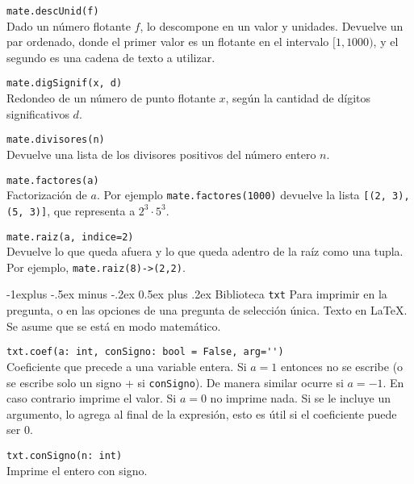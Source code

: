 \documentclass[10pt,landscape]{article}
\makeatletter
\renewcommand{\subsection}{\@startsection{subsection}{2}{0mm}%
                                {-1explus -.5ex minus -.2ex}%
                                {0.5ex plus .2ex}%
                                {\normalfont\normalsize\bfseries}}
\makeatother
\begin{document}
\begin{multicols}{3}
\begin{asparaitem}
\item \verb|mate.descUnid(f)| \\
  \quad Dado un n\'umero flotante $f$, lo descompone en un valor y unidades. Devuelve un par ordenado, donde el primer valor es un flotante en el intervalo $[1, 1000)$, y el segundo es una cadena de texto a utilizar.

\item \verb|mate.digSignif(x, d)| \\
  \quad Redondeo de un n\'umero de punto flotante $x$, seg\'un la cantidad de d\'igitos significativos $d$.

\item \verb|mate.divisores(n)| \\
  \quad Devuelve una lista de los divisores positivos del n\'umero entero $n$.

  \item \verb|mate.factores(a)| \\
\quad Factorización de $a$. Por ejemplo \verb|mate.factores(1000)| devuelve la lista \verb|[(2, 3), (5, 3)]|, que representa a $2^3\cdot 5^3$.

  \item \verb|mate.raiz(a, indice=2)| \\
    \quad Devuelve lo que queda afuera y lo que queda adentro de la ra\'iz como una tupla. Por ejemplo, \verb|mate.raiz(8)->(2,2)|.

\end{asparaitem}

\subsection{Biblioteca \texttt{txt}}
Para imprimir en la pregunta, o en las opciones de una pregunta de selecci\'on \'unica. Texto en \LaTeX. Se asume que se est\'a en modo matem\'atico.
\begin{asparaitem}
\item \verb|txt.coef(a: int, conSigno: bool = False, arg='')| \\
\quad Coeficiente que precede a una variable entera. Si $a=1$ entonces no se escribe (o se escribe solo un signo + si \verb|conSigno|). De manera similar ocurre si $a=-1$. En caso contrario imprime el valor. Si $a=0$ no imprime nada. Si se le incluye un argumento, lo agrega al final de la expresi\'on, esto es \'util si el coeficiente puede ser 0.

\item \verb|txt.conSigno(n: int)| \\
\quad Imprime el entero con signo.


\end{asparaitem}
\end{multicols}
\end{document}
